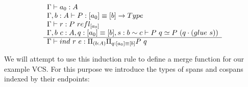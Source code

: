 \begin{code}[hide]
\AgdaSpace{}%
\AgdaOperator{\AgdaInductiveConstructor{]}}\AgdaSymbol{)}\AgdaSpace{}%
\AgdaSpace{}%
\AgdaSpace{}%
\AgdaSpace{}%
\AgdaSpace{}%
\AgdaSpace{}%
\AgdaSymbol{(}\AgdaSpace{}%
\AgdaSpace{}%
\AgdaSpace{}%
\AgdaSymbol{))}\<%
\\
%
\>[6]\AgdaComment{-------------------------------------------------------------------}\<%
\\
%
\>[6]\AgdaSpace{}%
\AgdaSymbol{\{}\AgdaSpace{}%
\AgdaSymbol{:}\AgdaSpace{}%
\AgdaSymbol{\}}\AgdaSpace{}%
\AgdaSpace{}%
\AgdaSymbol{(}\AgdaSpace{}%
\AgdaSymbol{:}\AgdaSpace{}%
\AgdaOperator{\AgdaInductiveConstructor{[}}\AgdaSpace{}%
\AgdaSpace{}%
\AgdaOperator{\AgdaInductiveConstructor{]}}\AgdaSpace{}%
\AgdaSpace{}%
\AgdaOperator{\AgdaInductiveConstructor{[}}\AgdaSpace{}%
\AgdaSpace{}%
\AgdaOperator{\AgdaInductiveConstructor{]}}\AgdaSymbol{)}\AgdaSpace{}%
\AgdaSpace{}%
\AgdaSpace{}%
\<%
\end{code}
\begin{equation}
  \label{eq:coequalizer-induction}
  \begin{centering}
    \begin{array}[t]{l}
      \Gamma \vdash a_0 : A\\
      \Gamma, b : A \vdash P : [a_0] \equiv [b] \ra Type\\
      \Gamma \vdash r : P~refl_{[a_0]}\\
      \Gamma, b~c : A, q : [a_0] \equiv [b], s : b \sim c \vdash P~q \simeq P~(q \cdot (glue~s))\\
      \hline
      \Gamma \vdash ind~r~e : \Pi_{(b : A)} \Pi_{q : [a_0] \equiv [b]} P~q
    \end{array}
  \end{centering}
\end{equation}

We will attempt to use this induction rule to define a merge function for our
example VCS. For this purpose we introduce the types of spans and cospans
indexed by their endpoints:

